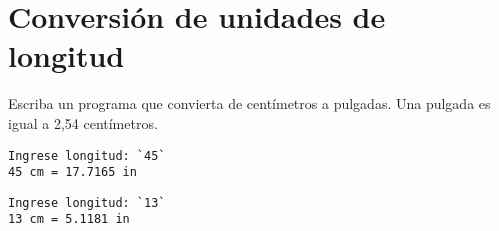 \section{Conversión de unidades de longitud}

Escriba un programa que convierta de centímetros a pulgadas. Una pulgada
es igual a 2,54 centímetros.

\begin{lstlisting}[language=testcase]
Ingrese longitud: `45`
45 cm = 17.7165 in
\end{lstlisting}


\begin{lstlisting}[language=testcase]
Ingrese longitud: `13`
13 cm = 5.1181 in
\end{lstlisting}
